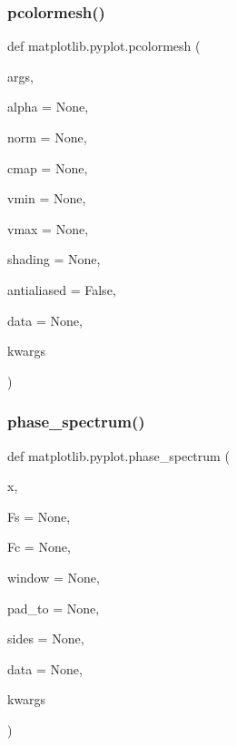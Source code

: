 \mbox{\label{namespacematplotlib_1_1pyplot_a07edb9e0597e5c40f44b1f6c94404928}} 
\subsubsection{\texorpdfstring{pcolormesh()}{pcolormesh()}}
{\footnotesize\ttfamily def matplotlib.\+pyplot.\+pcolormesh (\begin{DoxyParamCaption}\item[{}]{args,  }\item[{}]{alpha = {\ttfamily None},  }\item[{}]{norm = {\ttfamily None},  }\item[{}]{cmap = {\ttfamily None},  }\item[{}]{vmin = {\ttfamily None},  }\item[{}]{vmax = {\ttfamily None},  }\item[{}]{shading = {\ttfamily None},  }\item[{}]{antialiased = {\ttfamily False},  }\item[{}]{data = {\ttfamily None},  }\item[{}]{kwargs }\end{DoxyParamCaption})}

\mbox{\label{namespacematplotlib_1_1pyplot_adab4a177ba48fb8074247030fbca3955}} 
\subsubsection{\texorpdfstring{phase\+\_\+spectrum()}{phase\_spectrum()}}
{\footnotesize\ttfamily def matplotlib.\+pyplot.\+phase\+\_\+spectrum (\begin{DoxyParamCaption}\item[{}]{x,  }\item[{}]{Fs = {\ttfamily None},  }\item[{}]{Fc = {\ttfamily None},  }\item[{}]{window = {\ttfamily None},  }\item[{}]{pad\+\_\+to = {\ttfamily None},  }\item[{}]{sides = {\ttfamily None},  }\item[{}]{data = {\ttfamily None},  }\item[{}]{kwargs }\end{DoxyParamCaption})}

